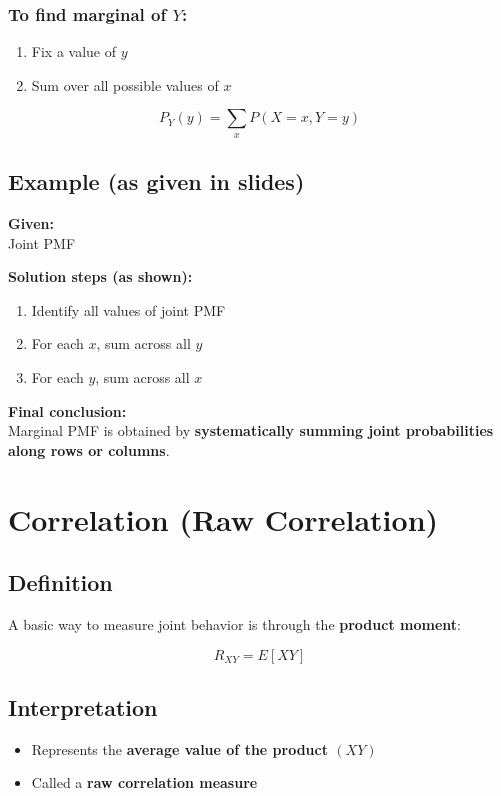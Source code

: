 \documentclass[12pt]{article}
\begin{document}
\subsubsection*{To find marginal of $Y$:}

\begin{enumerate}
    \item Fix a value of $y$
    \item Sum over all possible values of $x$
\end{enumerate}

\[
P_Y(y) = \sum_x P(X=x, Y=y)
\]

\subsection*{Example (as given in slides)}

\textbf{Given:} \\
Joint PMF

\textbf{Solution steps (as shown):}

\begin{enumerate}
    \item Identify all values of joint PMF
    \item For each $x$, sum across all $y$
    \item For each $y$, sum across all $x$
\end{enumerate}

\textbf{Final conclusion:} \\
Marginal PMF is obtained by \textbf{systematically summing joint probabilities along rows or columns}.

\section{Correlation (Raw Correlation)}

\subsection*{Definition}

A basic way to measure joint behavior is through the \textbf{product moment}:

\[
R_{XY} = E[XY]
\]

\subsection*{Interpretation}

\begin{itemize}
    \item Represents the \textbf{average value of the product $(XY)$}
    \item Called a \textbf{raw correlation measure}
\end{itemize}
\end{document}
